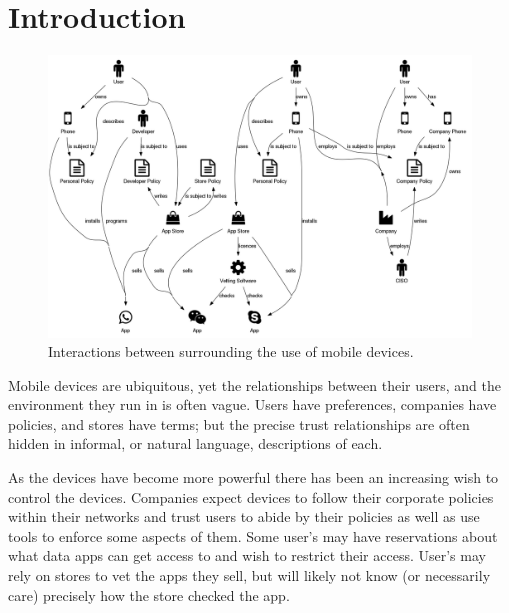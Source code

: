 \documentclass[thesis.tex]{subfiles}
\begin{document}
\chapter{Introduction}

%

\begin{figure}
  \centering
  \includegraphics[width=\linewidth]{figures/mobile-ecosystem.png}
  \caption{Interactions between surrounding the use of mobile devices.}
  \label{fig:mobile-ecosystem}
\end{figure}

Mobile devices are ubiquitous, yet the relationships between their users, and
the environment they run in is often vague. Users have preferences,
companies have policies, and stores have terms; but the precise trust
relationships are often hidden in informal, or natural language, descriptions of
each.

As the devices have become more powerful there has been an increasing wish to
control the devices. Companies expect devices to follow their corporate policies
within their networks and trust users to abide by their policies as well as use
tools to enforce some aspects of them. Some user's may have reservations about
what data apps can get access to and wish to restrict their access. User's may rely on
stores to vet the apps they sell, but will likely not know (or necessarily care)
precisely how the store checked the app.
\end{document}
